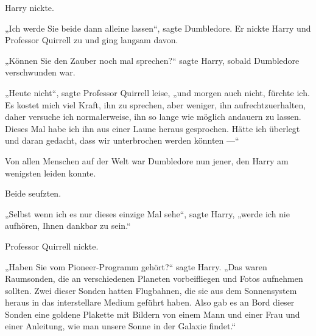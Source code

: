 Harry nickte.

„Ich werde Sie beide dann alleine lassen“, sagte Dumbledore. Er nickte Harry und Professor Quirrell zu und ging langsam davon.

„Können Sie den Zauber noch mal sprechen?“ sagte Harry, sobald Dumbledore verschwunden war.

„Heute nicht“, sagte Professor Quirrell leise, „und morgen auch nicht, fürchte ich. Es kostet mich viel Kraft, ihn zu sprechen, aber weniger, ihn aufrechtzuerhalten, daher versuche ich normalerweise, ihn so lange wie möglich andauern zu lassen. Dieses Mal habe ich ihn aus einer Laune heraus gesprochen. Hätte ich überlegt und daran gedacht, dass wir unterbrochen werden könnten —“

Von allen Menschen auf der Welt war Dumbledore nun jener, den Harry am wenigsten leiden konnte.

Beide seufzten.

„Selbst wenn ich es nur dieses einzige Mal sehe“, sagte Harry, „werde ich nie aufhören, Ihnen dankbar zu sein.“

Professor Quirrell nickte.

„Haben Sie vom Pioneer-Programm gehört?“ sagte Harry.
„Das waren Raumsonden, die an verschiedenen Planeten vorbeifliegen und Fotos aufnehmen sollten. Zwei dieser Sonden hatten Flugbahnen, die sie aus dem Sonnensystem heraus in das interstellare Medium geführt haben. Also gab es an Bord dieser Sonden eine goldene Plakette mit Bildern von einem Mann und einer Frau und einer Anleitung, wie man unsere Sonne in der Galaxie findet.“%


